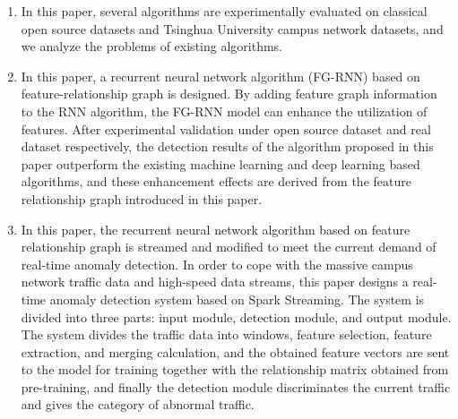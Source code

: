 \begin{abstract*}
  \begin{enumerate}
    \item In this paper, several algorithms are experimentally evaluated on classical open source datasets and Tsinghua University campus network datasets, and we analyze the problems of existing algorithms.
    \item In this paper, a recurrent neural network algorithm (FG-RNN) based on feature-relationship graph is designed. By adding feature graph information to the RNN algorithm, the FG-RNN model can enhance the utilization of features. After experimental validation under open source dataset and real dataset respectively, the detection results of the algorithm proposed in this paper outperform the existing machine learning and deep learning based algorithms, and these enhancement effects are derived from the feature relationship graph introduced in this paper.
    \item In this paper, the recurrent neural network algorithm based on feature relationship graph is streamed and modified to meet the current demand of real-time anomaly detection. In order to cope with the massive campus network traffic data and high-speed data streams, this paper designs a real-time anomaly detection system based on Spark Streaming. The system is divided into three parts: input module, detection module, and output module. The system divides the traffic data into windows, feature selection, feature extraction, and merging calculation, and the obtained feature vectors are sent to the model for training together with the relationship matrix obtained from pre-training, and finally the detection module discriminates the current traffic and gives the category of abnormal traffic.
  \end{enumerate}



\end{abstract*}
